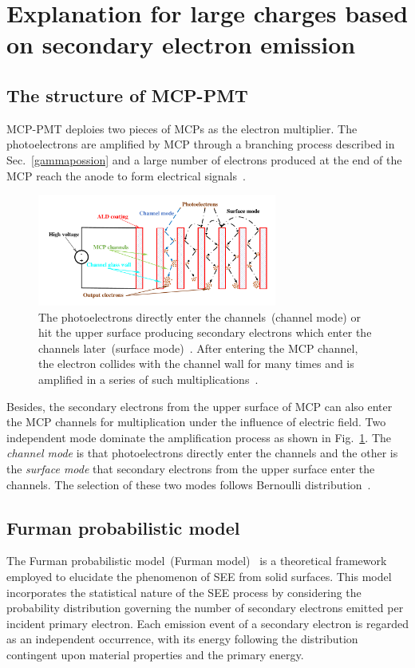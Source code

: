 \section{Explanation for large charges based on secondary electron emission}\label{sec:see}

\subsection{The structure of MCP-PMT}\label{subsec:structure}
MCP-PMT deploies two pieces of MCPs as the electron multiplier.
The photoelectrons are amplified by MCP through a branching process described in Sec.~\ref{gammapossion}
and a large number of electrons produced at the end of the MCP reach the anode to form electrical signals~\cite{2013Photodetectors}.

\begin{figure}[H]
    \centering
    \includegraphics[width=0.7\textwidth]{pic/mcp.pdf}
    \caption{The photoelectrons directly enter the channels~(channel mode) or hit the upper surface producing secondary electrons
        which enter the channels later~(surface mode)~\cite{2016Optimization}. After entering the MCP channel, the electron collides
        with the channel wall for many times and is amplified in a series of such multiplications~\cite{1955Scintillation}.}\label{fig:MCP}
    \label{fig:mcp_modes}
\end{figure}

Besides, the secondary electrons from the upper surface of MCP can also enter the MCP channels for multiplication
under the influence of electric field.\@
Two independent mode dominate the amplification process as shown in Fig.~\ref{fig:mcp_modes}.
The \textit{channel mode} is that photoelectrons directly enter the channels
and the other is the \textit{surface mode} that secondary electrons from the upper surface enter the channels.
The selection of these two modes follows Bernoulli distribution~\cite{1955Scintillation}.

\subsection{Furman probabilistic model}\label{subsec:fuman}
The Furman probabilistic model~(Furman model)~\cite{2002Probabilistic}
is a theoretical framework employed to elucidate the phenomenon of SEE from solid surfaces.
This model incorporates the statistical nature of the SEE process
by considering the probability distribution governing the number of secondary electrons emitted per incident primary electron.
Each emission event of a secondary electron is regarded as an independent occurrence,
with its energy following the distribution contingent upon material properties and the primary energy.

